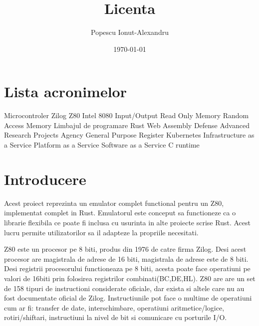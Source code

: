 \documentclass[titlepage,12pt]{article}
\begin{document}
    \title{Licenta}
    \author{Popescu Ionut-Alexandru}
    \date{\today}

    \maketitle
    \renewcommand{\contentsname}{Cuprins}
    \renewcommand{\listfigurename}{Lista figurilor}
    \renewcommand{\listtablename}{Lista tabelelor}
    \renewcommand{\figurename}{Figura}
    \renewcommand{\tablename}{Tabela}
    \renewcommand{\lstlistingname}{Cod}
    \tableofcontents
    \clearpage
    \listoffigures
    \clearpage
    \listoftables
    \clearpage
    \section*{Lista acronimelor} %
    \begin{acronym}
               {Microcontroler Zilog Z80}
             {Intel 8080}
                {Input/Output}
               {Read Only Memory}
               {Random Access Memory}
              {Limbajul de programare Rust}
              {Web Assembly}
             {Defense Advanced Research Projects Agency}
               {General Purpose Register}
               {Kubernetes}
              {Infrastructure as a Service}
              {Platform as a Service}
              {Software as a Service}
               {C runtime}
    \end{acronym}
    \clearpage


    \section{Introducere}
    Acest proiect reprezinta un emulator complet functional pentru un \ac {Z80}, implementat complet in \ac {Rust}.
    Emulatorul este conceput sa functioneze ca o librarie flexibila ce poate fi inclusa cu usurinta in alte proiecte scrise Rust. Acest lucru permite utilizatorilor sa il adapteze la propriile necesitati.

    \ac {Z80} este un procesor pe 8 biti, produs din 1976 de catre firma Zilog. Desi acest procesor are magistrala de adrese de 16 biti, magistrala de adrese este de 8 biti.
    Desi registrii procesorului functioneaza pe 8 biti, acesta poate face operatiuni pe valori de 16biti prin folosirea registrilor combinati(BC,DE,HL).
    Z80 are are un set de 158 tipuri de instructioni considerate oficiale, dar exista si altele care nu au fost documentate oficial de Zilog. Instructiunile pot face o multime de operatiuni cum ar fi: transfer de date, interschimbare, operatiuni aritmetice/logice, rotiri/shiftari, instructiuni la nivel de bit si comunicare cu porturile I/O.
\end{document}
